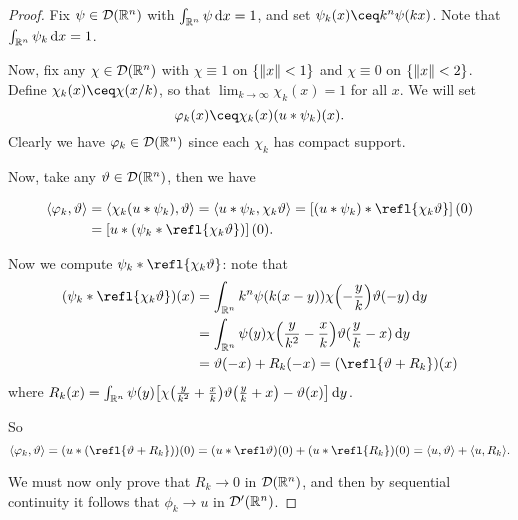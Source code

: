 \begin{proof}
	Fix $\psi \in \mathcal D(\mathbb R^n)$ with $\int_{\mathbb R^n} \psi \dd{x} = 1$, and set $\psi_k(x) \ceq k^n \psi(kx)$. Note that $\int_{\mathbb R^n} \psi_k \dd{x} = 1$.
	
	Now, fix any $\chi \in \mathcal D(\mathbb R^n)$ with $\chi \equiv 1$ on $\qty{\norm{x} < 1}$ and $\chi \equiv 0$ on $\qty{\norm{x} < 2}$. Define $\chi_k(x) \ceq \chi(x/k)$, so that $\lim_{k\to\infty} \chi_k(x) = 1$ for all $x$. We will set
	\[
	\phi_k(x) \ceq \chi_k(x) (u * \psi_k)(x). 
	\]
	Clearly we have $\varphi_k \in \mathcal D(\mathbb R^n)$ since each $\chi_k$ has compact support. 
	
	Now, take any $\vartheta \in \mathcal D(\mathbb R^n)$, then we have
	
	\begin{align*}
		\ang{\phi_k, \theta} &= \ang{\chi_k (u * \psi_k), \theta} = \ang{u * \psi_k, \chi_k \theta} = \qty[ (u * \psi_k) * \refl{\chi_k\theta}](0) \\
		&= \qty[u * \qty(\psi_k * \refl{\chi_k \theta})](0).
	\end{align*}

	Now we compute $\psi_k * \refl{\chi_k\theta}$: note that 
	\begin{align*}
		(\psi_k * \refl{\chi_k\theta})(x) &= \int_{\RR^n} k^n\psi(k(x-y)) \chi\qty(-\frac yk) \theta(-y) \dd{y} \\
		&= \int_{\RR^n} \psi(y) \chi\qty(\frac{y}{k^2} - \frac xk) \theta(\frac yk - x) \dd{y} \\
		&= \theta(-x) + R_k(-x) = (\refl{\theta + R_k})(x)
	\end{align*}
where $R_k(x) = \int_{\mathbb R^n} \psi(y) \qty[ \chi\qty(\frac y{k^2} + \frac xk) \vartheta\qty(\frac yk + x )- \vartheta(x)] \dd{y}$.

So \[
\ang{\phi_k, \theta} = (u * (\refl{\theta + R_k}))(0) = (u *\refl\theta)(0) + (u * \refl{R_k})(0) = \ang{u, \theta} + \ang{u, R_k}. 
\]

We must now only prove that $R_k \to 0$ in $\mathcal D(\mathbb R^n)$, and then by sequential continuity it follows that $\phi_k \to u$  in $\mathcal D'(\mathbb R^n)$. 
\end{proof}

